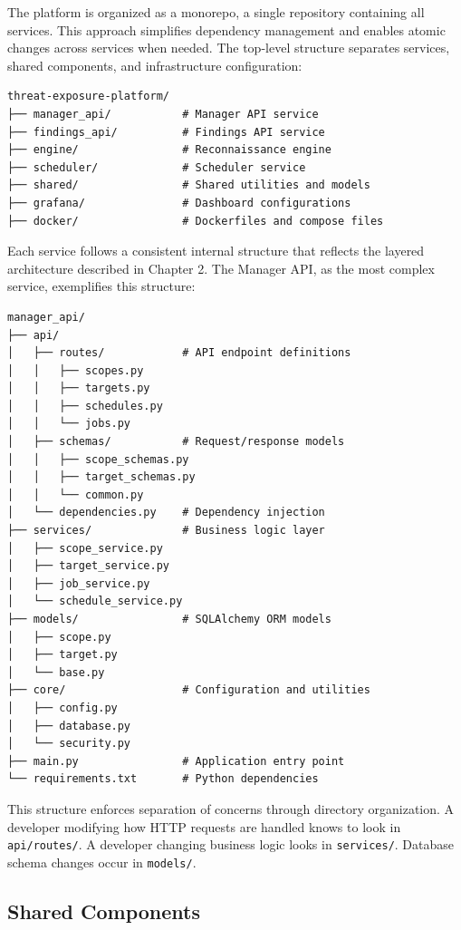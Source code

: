 \documentclass[a4paper,12pt]{report}
\begin{document}
The platform is organized as a monorepo, a single repository containing all services. This approach simplifies dependency management and enables atomic changes across services when needed. The top-level structure separates services, shared components, and infrastructure configuration:\hfill \break

\begin{verbatim}
threat-exposure-platform/
├── manager_api/           # Manager API service
├── findings_api/          # Findings API service  
├── engine/                # Reconnaissance engine
├── scheduler/             # Scheduler service
├── shared/                # Shared utilities and models
├── grafana/               # Dashboard configurations
├── docker/                # Dockerfiles and compose files
\end{verbatim}

Each service follows a consistent internal structure that reflects the layered architecture described in Chapter 2. The Manager API, as the most complex service, exemplifies this structure:\hfill \break

\begin{verbatim}
manager_api/
├── api/
│   ├── routes/            # API endpoint definitions
│   │   ├── scopes.py
│   │   ├── targets.py
│   │   ├── schedules.py
│   │   └── jobs.py
│   ├── schemas/           # Request/response models
│   │   ├── scope_schemas.py
│   │   ├── target_schemas.py
│   │   └── common.py
│   └── dependencies.py    # Dependency injection
├── services/              # Business logic layer
│   ├── scope_service.py
│   ├── target_service.py
│   ├── job_service.py
│   └── schedule_service.py
├── models/                # SQLAlchemy ORM models
│   ├── scope.py
│   ├── target.py
│   └── base.py
├── core/                  # Configuration and utilities
│   ├── config.py
│   ├── database.py
│   └── security.py
├── main.py                # Application entry point
└── requirements.txt       # Python dependencies
\end{verbatim}

This structure enforces separation of concerns through directory organization. A developer modifying how HTTP requests are handled knows to look in \texttt{api/routes/}. A developer changing business logic looks in \texttt{services/}. Database schema changes occur in \texttt{models/}.\hfill \break

\subsection{Shared Components}
\end{document}
